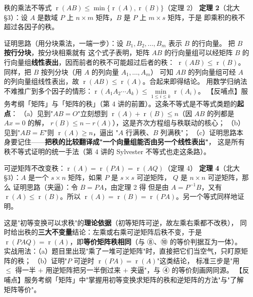 \begin{fdeep}{秩的乘法不等式 $\operatorname{r}(AB)\le\min\{\operatorname{r}(A),\operatorname{r}(B)\}$（定理 2）}
\textbf{定理 2}（北大 §3）：设 $A$ 是数域 $P$ 上 $n\times m$ 矩阵，$B$ 是 $P$ 上 $m\times s$ 矩阵，于是
即乘积的秩不超过各因子的秩。

证明思路（用分块乘法，一端一步）：设 $B_1,B_2,\dots,B_m$ 表示 $B$ 的行向量。
把 $B$ \textbf{按行分块}，按分块相乘就有
这个式子表明，矩阵 $AB$ 的行向量组可以经矩阵 $B$ 的行向量组\textbf{线性表出}，因而前者的秩不可能超过后者的秩：
$\operatorname{r}(AB)\le\operatorname{r}(B)$。同样，把 $B$ 按列分块（用 $A$ 的列向量 $A_1,\dots,A_m$）
可知 $AB$ 的列向量组可经 $A$ 的列向量组线性表出，故 $\operatorname{r}(AB)\le\operatorname{r}(A)$。合起来即得结论。
用数学归纳法不难推广到多个因子的情形：$\operatorname{r}(A_1A_2\cdots A_k)\le\min\limits_{1\le i\le k}\operatorname{r}(A_i)$。
【反哺点】服务考纲「矩阵」与「矩阵的秩」（第 4 讲的前置）。这条不等式是不等式类题的\textbf{起点}：
（a）见到"$AB=O$"立刻想到 $\operatorname{r}(A)+\operatorname{r}(B)\le n$（因 $AB$ 的列都是 $Ax=0$ 的解，
$r(B)\le n-r(A)$），这是齐次方程组与秩联动的核心；
（b）见到"$AB=E$"则 $\operatorname{r}(A)\ge n$，逼出 "$A$ 行满秩、$B$ 列满秩"；
（c）证明思路本身要记住——\textbf{把秩的比较翻译成"一个向量组能否由另一个线性表出"}，
这是所有秩不等式证明的统一手法（第 4 讲的 Sylvester 不等式也走这条路）。
\end{fdeep}

\begin{fdeep}{可逆矩阵不改变秩：$\operatorname{r}(A)=\operatorname{r}(PA)=\operatorname{r}(AQ)$（定理 4）}
\textbf{定理 4}（北大 §3）：$A$ 是一个 $s\times n$ 矩阵，如果 $P$ 是 $s\times s$ 可逆矩阵，
$Q$ 是 $n\times n$ 可逆矩阵，那么
证明思路（夹逼）：令 $B=PA$，由定理 2 得
但是由 $A=P^{-1}B$，又有 $\operatorname{r}(A)\le\operatorname{r}(B)$。所以
$\operatorname{r}(A)=\operatorname{r}(B)=\operatorname{r}(PA)$。另一个等式同样地证明。

这是"初等变换可以求秩"的\textbf{理论依据}（初等矩阵可逆，故左乘右乘都不改秩），
同时给出秩的\textbf{三大不变量}结论：左乘或右乘可逆矩阵后秩不变，于是
$\operatorname{r}(PAQ)=\operatorname{r}(A)$，即\textbf{等价矩阵秩相同}（与 ⑧、⑩ 的等价判据互为一体）。
实战用法：（a）题目里出现"乘了一堆可逆矩阵"时，直接把它们当空气，只盯原矩阵的秩；
（b）证明"$P$ 可逆时 $\operatorname{r}(PA)=\operatorname{r}(A)$"这类结论，
标准三步是"用 $\le$ 得一半 $+$ 用逆矩阵把另一半倒过来 $+$ 夹逼"，与 ④ 的等价刻画网同源。
【反哺点】服务考纲「矩阵」中"掌握用初等变换求矩阵的秩和逆矩阵的方法"与"了解矩阵等价"。
\end{fdeep}


